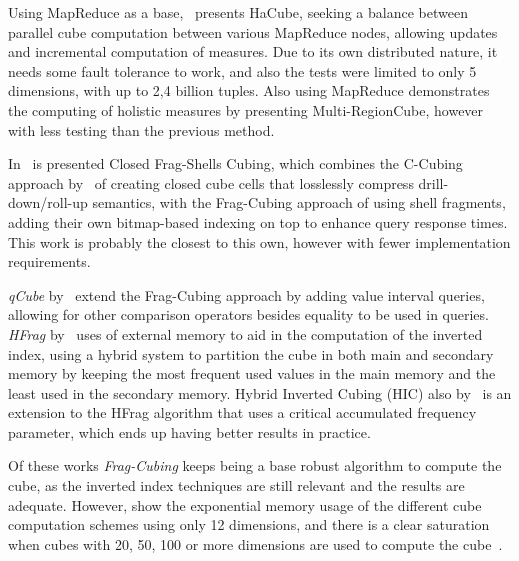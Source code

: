 Using MapReduce as a base,~ presents HaCube, seeking a balance between parallel cube computation between various MapReduce nodes, allowing updates and incremental computation of measures.
Due to its own distributed nature, it needs some fault tolerance to work, and also the tests were limited to only 5 dimensions, with up to 2,4 billion tuples.
Also using MapReduce  demonstrates the computing of holistic measures by presenting Multi-RegionCube, however with less testing than the previous method.

In~ is presented Closed Frag-Shells Cubing, which combines the C-Cubing approach by~ of creating closed cube cells that losslessly compress drill-down/roll-up semantics, with the Frag-Cubing approach of using shell fragments, adding their own bitmap-based indexing on top to enhance query response times.
This work is probably the closest to this own, however with fewer implementation requirements.

\textit{qCube} by~ extend the Frag-Cubing approach by adding value interval queries, allowing for other comparison operators besides equality to be used in queries.
\textit{HFrag} by~ uses of external memory to aid in the computation of the inverted index, using a hybrid system to partition the cube in both main and secondary memory by keeping the most frequent used values in the main memory and the least used in the secondary memory.
Hybrid Inverted Cubing (HIC) also by~ is an extension to the HFrag algorithm that uses a critical accumulated frequency parameter, which ends up having better results in practice.

Of these works \textit{Frag-Cubing} keeps being a base robust algorithm to compute the cube, as the inverted index techniques are still relevant and the results are adequate.
However,  show the exponential memory usage of the different cube computation schemes using only 12 dimensions, and there is a clear saturation when cubes with 20, 50, 100 or more dimensions are used to compute the cube~\cite{silva:2015:abordagensParaCubo}.

